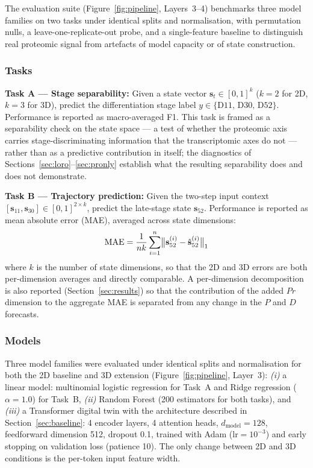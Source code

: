 \documentclass[5p,times,twocolumn]{elsarticle}
\newcommand{\rtag}[1]{}
\newcommand{\rev}[2]{\rtag{#1}#2}
\newcommand{\lang}[1]{#1}
\begin{document}
The evaluation suite (Figure~\ref{fig:pipeline}, Layers~3--4)
benchmarks three model families on two tasks under identical
splits and normalisation, with permutation nulls, a
leave-one-replicate-out probe, and a single-feature baseline
to distinguish real proteomic signal from \lang{artefacts of
  model capacity or of state construction}.

\subsubsection{Tasks}

\textbf{Task A --- Stage separability:}
Given a state vector $\mathbf{s}_{t} \in [0,1]^{k}$
($k = 2$ for 2D, $k = 3$ for 3D), predict the differentiation
stage label $y \in \{\text{D11, D30, D52}\}$.
Performance is reported as macro-averaged F1.
This task is framed as a separability check on the state
space --- a test of whether the proteomic axis carries
stage-discriminating information that the transcriptomic
axes do not --- rather than as a predictive contribution in
itself; the diagnostics of
Sections~\ref{sec:loro}--\ref{sec:pronly} establish what the
resulting separability does and does not demonstrate.

\textbf{Task B --- Trajectory prediction:}
Given the two-step input context
$[\mathbf{s}_{11}, \mathbf{s}_{30}] \in [0,1]^{2 \times k}$,
predict the late-stage state $\mathbf{s}_{52}$.
Performance is reported as mean absolute error (MAE),
averaged across state dimensions:
%
\begin{equation}
  \text{MAE} =
    \frac{1}{n\textcolor{black}{k}}
    \sum_{i=1}^{n}
    \bigl\lVert \mathbf{s}^{(i)}_{52} -
                \hat{\mathbf{s}}^{(i)}_{52} \bigr\rVert_{1}
  \label{eq:mae}
\end{equation}
\rev{AC}{where $k$ is the number of state dimensions, so that
  the 2D and 3D errors are both per-dimension averages and
  directly comparable.}
%
A per-dimension decomposition is also reported
(Section~\ref{sec:results}) so that the contribution of the
added $Pr$ dimension to the aggregate MAE is separated from
any change in the $P$ and $D$ forecasts.

\subsubsection{Models}

Three model families were evaluated under identical splits
and normalisation for both the 2D baseline and 3D extension
(Figure~\ref{fig:pipeline}, Layer~3):
\textit{(i)} \rev{AC}{a linear model: multinomial logistic
  regression for Task~A and} Ridge regression ($\alpha = 1.0$)
\rev{AC}{for Task~B},
\textit{(ii)} Random Forest (\rev{AC}{200 estimators for both
  tasks}), and
\textit{(iii)} a Transformer digital twin with the
architecture described in Section~\ref{sec:baseline}:
4 encoder layers, 4 attention heads,
$d_{\text{model}} = 128$, feedforward dimension 512,
dropout 0.1, trained with Adam ($\text{lr} = 10^{-3}$)
and early stopping on validation loss (patience 10).
The only change between 2D and 3D conditions is the
per-token input feature width.
\end{document}
